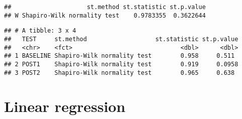 \documentclass[]{book}
\newenvironment{Shaded}{\begin{snugshade}}{\end{snugshade}}
\newcommand{\ControlFlowTok}[1]{\textcolor[rgb]{0.13,0.29,0.53}{\textbf{#1}}}
\newcommand{\KeywordTok}[1]{\textcolor[rgb]{0.13,0.29,0.53}{\textbf{#1}}}
\newcommand{\NormalTok}[1]{#1}
\newcommand{\OperatorTok}[1]{\textcolor[rgb]{0.81,0.36,0.00}{\textbf{#1}}}
\newcommand{\StringTok}[1]{\textcolor[rgb]{0.31,0.60,0.02}{#1}}
\begin{document}
\begin{verbatim}
##                     st.method st.statistic st.p.value
## W Shapiro-Wilk normality test    0.9783355  0.3622644
\end{verbatim}

\begin{Shaded}
\end{Shaded}

\begin{verbatim}
## # A tibble: 3 x 4
##   TEST     st.method                   st.statistic st.p.value
##   <chr>    <fct>                              <dbl>      <dbl>
## 1 BASELINE Shapiro-Wilk normality test        0.958     0.511 
## 2 POST1    Shapiro-Wilk normality test        0.919     0.0958
## 3 POST2    Shapiro-Wilk normality test        0.965     0.638
\end{verbatim}

\hypertarget{linear-regression}{%
\section{Linear regression}\label{linear-regression}}
\end{document}
